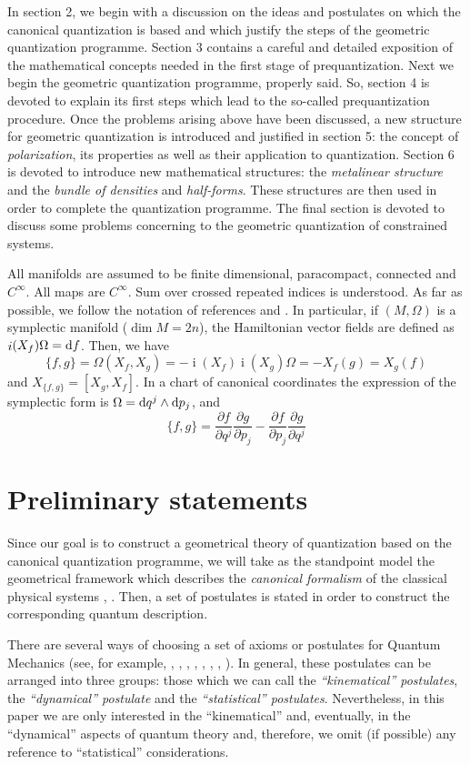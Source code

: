\documentclass[12pt]{article}
\theoremstyle{plain}
\def\derpar#1#2{\frac{\partial{#1}}{\partial{#2}}}
\def\d{{\rm d}}
\def\inn{\mathop{i}\nolimits}
\begin{document}
In section 2, we begin with a discussion on the ideas and postulates on
which the canonical
quantization is based and which justify the steps of the geometric
quantization programme.
Section 3 contains a careful and detailed exposition
of the mathematical concepts needed in the first stage of
prequantization.
Next we begin the geometric quantization programme, properly said.
So, section 4 is devoted to explain its first steps
which lead to the so-called prequantization procedure.
Once the problems arising above have been discussed,
a new structure for geometric quantization is introduced and justified
in section 5: the concept of {\it polarization}, its
properties as well as their application to quantization.
Section 6 is devoted to introduce new mathematical structures:
the {\it metalinear structure} and the {\it bundle of densities} and
{\it half-forms}.
These structures are then used in order to complete the quantization
programme.
The final section is devoted to discuss some problems concerning to
the geometric quantization of constrained systems.

All manifolds are assumed to be finite dimensional,
paracompact, connected and $C^\infty$. All maps are $C^\infty$.
Sum over crossed repeated indices is understood.
As far as possible, we follow the notation of references
\cite{AM-78} and \cite{AMR-mtaa}.
In particular, if $(M,\Omega )$ is a symplectic manifold ($\dim M =
2n$),
the Hamiltonian vector fields are defined as $\inn(X_f)\Omega = \d f$.
Then, we have
$$
\{ f,g \} = \Omega (X_f,X_g) =-\inn(X_f)\inn(X_g)\Omega =-X_f(g) =
X_g(f)
$$
and $X_{\{f,g\}} =[X_g,X_f]$.
In a chart of canonical coordinates the expression of the symplectic
form is
$\Omega = \d q^j \wedge \d p_j$, and
$$
\{ f,g \} =
\derpar{f}{q^j}\derpar{g}{p_j}-\derpar{f}{p_j}\derpar{g}{q^j}
$$



\section{Preliminary statements}


Since our goal is to construct a geometrical theory
of quantization based on the canonical quantization programme,
we will take as the standpoint model
the geometrical framework which describes the {\it canonical formalism}
of the classical physical systems  \cite{AM-78}, \cite{Ar-mmmc}.
Then, a set of postulates is stated in order to construct
the corresponding quantum description.

There are several ways of choosing a set of axioms
or postulates for Quantum Mechanics (see, for example,
\cite{CDL-77}, \cite{Di-pqm}, \cite{GP-78}, \cite{Ja-fqm},
\cite{Mk-mfqm},
\cite{Mo-qmdo}, \cite{Se-pgqm}, \cite{Vn-mfqm}).
In general, these postulates can be arranged into three groups:
those which we can call the {\it ``kinematical'' postulates},
the {\it``dynamical'' postulate} and the {\it ``statistical''
postulates}.
Nevertheless, in this paper we are only interested in the
``kinematical'' and,
eventually, in the ``dynamical'' aspects of quantum theory
and, therefore, we omit (if possible) any reference to ``statistical''
considerations.
\end{document}
